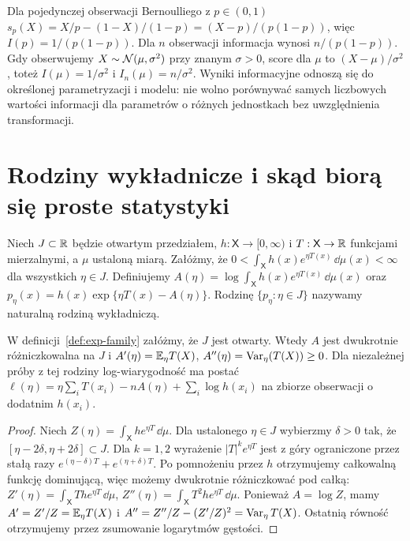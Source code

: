 \begin{przyklad}
Dla pojedynczej obserwacji Bernoulliego z $p\in(0,1)$
$s_p(X)=X/p-(1-X)/(1-p)=(X-p)/(p(1-p))$, więc
$I(p)=1/(p(1-p))$. Dla $n$ obserwacji informacja wynosi
$n/(p(1-p))$. Gdy obserwujemy $X\sim\mathcal N(\mu,\sigma^2)$ przy znanym
$\sigma>0$, score dla $\mu$ to $(X-\mu)/\sigma^2$, toteż
$I(\mu)=1/\sigma^2$ i $I_n(\mu)=n/\sigma^2$.
Wyniki informacyjne odnoszą się do określonej parametryzacji i modelu:
nie wolno porównywać samych liczbowych wartości informacji dla parametrów
o różnych jednostkach bez uwzględnienia transformacji.
\end{przyklad}

\section{Rodziny wykładnicze i skąd biorą się proste statystyki}
\begin{definicja}\label{def:exp-family}
Niech $J\subset\mathbb R$ będzie otwartym przedziałem, $h:\mathsf X\to[0,\infty)$
i $T:\mathsf X\to\mathbb R$ funkcjami mierzalnymi, a $\mu$ ustaloną miarą.
Załóżmy, że
$0<\int_{\mathsf X}h(x)e^{\eta T(x)}\,\dd\mu(x)<\infty$ dla wszystkich $\eta\in J$.
Definiujemy
$A(\eta)=\log\int_{\mathsf X}h(x)e^{\eta T(x)}\,\dd\mu(x)$ oraz
$p_\eta(x)=h(x)\exp\{\eta T(x)-A(\eta)\}$.
Rodzinę $\{p_\eta:\eta\in J\}$ nazywamy naturalną rodziną wykładniczą.
\end{definicja}

\begin{twierdzenie}\label{thm:exp-family-moments}
W definicji~\ref{def:exp-family} załóżmy, że $J$ jest otwarty.
Wtedy $A$ jest dwukrotnie różniczkowalna na $J$ i
$A'(\eta)=\mathbb E_\eta T(X)$, $A''(\eta)=\operatorname{Var}_\eta(T(X))\ge0$.
Dla niezależnej próby z tej rodziny log-wiarygodność ma postać
$\ell(\eta)=\eta\sum_iT(x_i)-nA(\eta)+\sum_i\log h(x_i)$
na zbiorze obserwacji o dodatnim $h(x_i)$.
\end{twierdzenie}
\begin{proof}
Niech $Z(\eta)=\int_{\mathsf X}h e^{\eta T}\,\dd\mu$. Dla ustalonego
$\eta\in J$ wybierzmy $\delta>0$ tak, że
$[\eta-2\delta,\eta+2\delta]\subset J$. Dla $k=1,2$ wyrażenie
$|T|^k e^{\eta T}$ jest z góry ograniczone przez stałą razy
$e^{(\eta-\delta)T}+e^{(\eta+\delta)T}$.
Po pomnożeniu przez $h$ otrzymujemy całkowalną funkcję dominującą,
więc możemy dwukrotnie różniczkować pod całką:
$Z'(\eta)=\int_{\mathsf X}T h e^{\eta T}\,\dd\mu$,
$Z''(\eta)=\int_{\mathsf X}T^2 h e^{\eta T}\,\dd\mu$.
Ponieważ $A=\log Z$, mamy $A'=Z'/Z=\mathbb E_\eta T(X)$ i
$A''=Z''/Z-(Z'/Z)^2=\operatorname{Var}_\eta T(X)$.
Ostatnią równość otrzymujemy przez zsumowanie logarytmów gęstości.
\end{proof}

